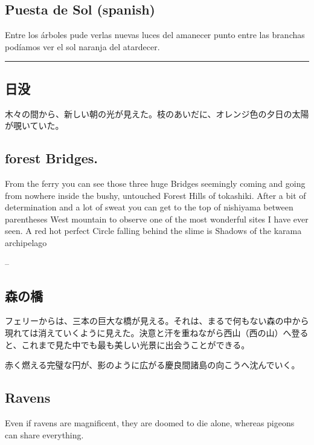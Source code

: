 \documentclass[
  letterpaper,
  oneside]{scrbook}
\begin{document}
\subsection{Puesta de Sol (spanish)}\label{puesta-de-sol-spanish}

Entre los árboles pude verlas nuevas luces del amanecer punto entre las
branchas podíamos ver el sol naranja del atardecer.

\begin{center}\rule{0.5\linewidth}{0.5pt}\end{center}

\subsection{日没}\label{ux65e5ux6ca1}

木々の間から、新しい朝の光が見えた。枝のあいだに、オレンジ色の夕日の太陽が覗いていた。

\subsection{forest Bridges.}\label{forest-bridges.}

From the ferry you can see those three huge Bridges seemingly coming and
going from nowhere inside the bushy, untouched Forest Hills of
tokashiki. After a bit of determination and a lot of sweat you can get
to the top of nishiyama between parentheses West mountain to observe one
of the most wonderful sites I have ever seen. A red hot perfect Circle
falling behind the slime is Shadows of the karama archipelago

--

\subsection{森の橋}\label{ux68eeux306eux6a4b}

フェリーからは、三本の巨大な橋が見える。それは、まるで何もない森の中から現れては消えていくように見えた。決意と汗を重ねながら西山（西の山）へ登ると、これまで見た中でも最も美しい光景に出会うことができる。

赤く燃える完璧な円が、影のように広がる慶良間諸島の向こうへ沈んでいく。

\subsection{Ravens}\label{ravens}

Even if ravens are magnificent, they are doomed to die alone, whereas
pigeons can share everything.
\end{document}
